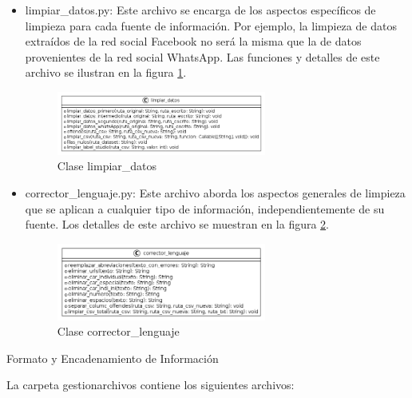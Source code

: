 \begin{itemize}

\item limpiar\_datos.py: Este archivo se encarga de los aspectos específicos de limpieza para cada fuente de información. Por ejemplo, la limpieza de datos extraídos de la red social Facebook no será la misma que la de datos provenientes de la red social WhatsApp. Las funciones y detalles de este archivo se ilustran en la figura \ref{fig:uml1}.

\begin{figure}
	\includegraphics[width=0.65\textwidth]{capitulo5/figuras/fig1.png}
	\caption{Clase limpiar\_datos}
	\label{fig:uml1}
\end{figure}

\item corrector\_lenguaje.py: Este archivo aborda los aspectos generales de limpieza que se aplican a cualquier tipo de información, independientemente de su fuente. Los detalles de este archivo se muestran en la figura \ref{fig:uml2}.

\begin{figure}
	\includegraphics[width=0.65\textwidth]{capitulo5/figuras/fig2.png}
	\caption{Clase corrector\_lenguaje}
	\label{fig:uml2}
\end{figure}

\end{itemize}

Formato y Encadenamiento de Información

La carpeta gestionarchivos contiene los siguientes archivos:

